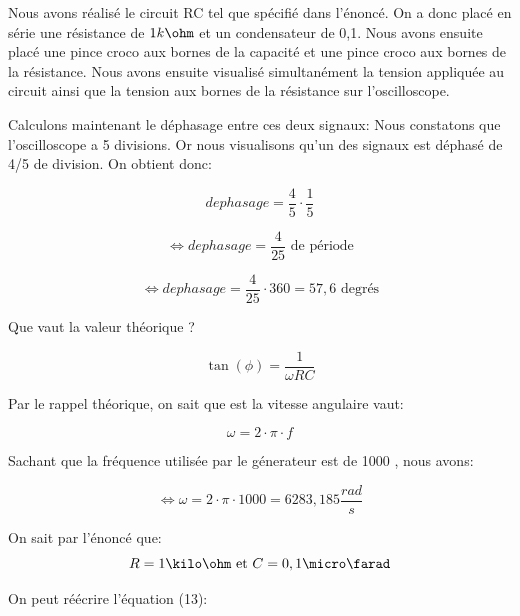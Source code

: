 \documentclass{report}
\begin{document}
Nous avons r\'ealis\'e le circuit RC tel que sp\'ecifi\'e dans l'\'enonc\'e. On a donc plac\'e en s\'erie une r\'esistance de $1 k\ohm$  et un condensateur de 0,1\micro\farad. Nous avons ensuite plac\'e une pince croco aux bornes de la capacit\'e et une pince croco aux bornes de la r\'esistance. Nous avons ensuite visualis\'e simultan\'ement la tension appliqu\'ee au circuit ainsi que la tension aux bornes de la r\'esistance sur l'oscilloscope.

Calculons maintenant le d\'ephasage entre ces deux signaux:
Nous constatons que l'oscilloscope a 5 divisions.
Or nous visualisons qu'un des signaux est d\'ephas\'e  de 4/5 de division. On obtient donc:

\begin{equation}
    dephasage = \frac{4}{5} \cdot \frac{1}{5}
\end{equation}

\begin{equation}
    \Leftrightarrow dephasage = \frac{4}{25} \text{ de p\'eriode}
\end{equation}

\begin{equation}
    \Leftrightarrow dephasage = \frac{4}{25} \cdot 360 = 57,6 \text{ degr\'es}
\end{equation}

Que vaut la valeur th\'eorique ?

\begin{equation}
    \tan(\phi) = \frac{1}{\omega RC}
\end{equation}

Par le rappel th\'eorique, on sait que  est la vitesse angulaire vaut:

\begin{equation}
    \omega = 2\cdot \pi \cdot f   
\end{equation}

Sachant que la fr\'equence utilis\'ee par le g\'enerateur est de 1000 \hertz, nous avons:

\begin{equation}
    \Leftrightarrow \omega = 2 \cdot \pi \cdot 1000 = 6283,185 \frac{rad}{s}
\end{equation}

On sait par l'\'enonc\'e que:
\begin{equation}
    R = 1\kilo\ohm \text{ et } C = 0,1\micro\farad 
\end{equation}

On peut r\'e\'ecrire l'\'equation (13):
\end{document}
